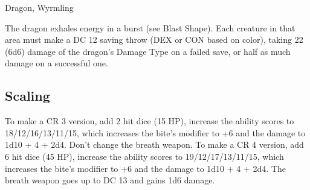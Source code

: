 \begin{DndMonster}[float*=b,width=\textwidth + 8pt]{Dragon, Wyrmling}
\begin{multicols}{2}
\DndMonsterAttack[
	name=Bite,
	distance=melee,
	type=weapon,
	mod=+4,
	reach=5,
	dmg=\DndDice{1d10 + 2},
	dmg-type=piercing,
	extra={ plus 2 (1d4) damage of the dragon's damage type.}
]

The dragon exhales energy in a burst (see Blast Shape). Each creature in that area must make a DC 12 saving throw (DEX or CON based on color), taking 22 (6d6) damage of the dragon's Damage Type on a failed save, or half as much damage on a successful one.
\subsection{Scaling}
To make a CR 3 version, add 2 hit dice (15 HP), increase the ability scores to 18/12/16/13/11/15, which increases the bite's modifier to +6 and the damage to 1d10 + 4 + 2d4. Don't change the breath weapon.
To make a CR 4 version, add 6 hit dice (45 HP), increase the ability scores to 19/12/17/13/11/15, which increases the bite's modifier to +6 and the damage to 1d10 + 4 + 2d4. The breath weapon goes up to DC 13 and gains 1d6 damage.
\end{multicols}
\end{DndMonster}
